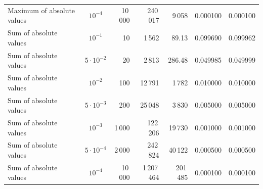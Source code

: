 \begin{tabular}{lcrrrrr}
Maximum of absolute values & $10^{-4}$ & 10\,000 & 240\,017 & 9\,058 & 0.000100 & 0.000100 \\
Sum of absolute values & $10^{-1}$ & 10 & 1\,562 & 89.13 & 0.099690 & 0.099962 \\
Sum of absolute values & $5\cdot 10^{-2}$ & 20 & 2\,813 & 286.48 & 0.049985 & 0.049999 \\
Sum of absolute values & $10^{-2}$ & 100 & 12\,791 & 1\,782 & 0.010000 & 0.010000 \\
Sum of absolute values & $5\cdot 10^{-3}$ & 200 & 25\,048 & 3\,830 & 0.005000 & 0.005000 \\
Sum of absolute values & $10^{-3}$ & 1\,000 & 122\,206 & 19\,730 & 0.001000 & 0.001000 \\
Sum of absolute values & $5\cdot 10^{-4}$ & 2\,000 & 242\,824 & 40\,122 & 0.000500 & 0.000500 \\
Sum of absolute values & $10^{-4}$ & 10\,000 & 1\,207\,464 & 201\,485 & 0.000100 & 0.000100 \\
\bottomrule
\end{tabular}